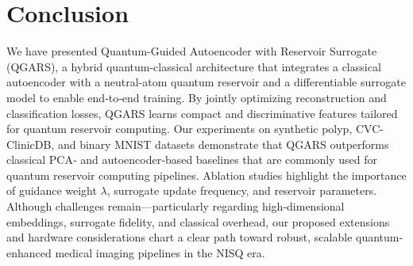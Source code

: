 \documentclass[conference]{IEEEtran}
\begin{document}
\section{Conclusion}

We have presented Quantum-Guided Autoencoder with Reservoir Surrogate (QGARS), a hybrid quantum-classical architecture that integrates a classical autoencoder with a neutral-atom quantum reservoir and a differentiable surrogate model to enable end‐to‐end training. By jointly optimizing reconstruction and classification losses, QGARS learns compact and discriminative features tailored for quantum reservoir computing. Our experiments on synthetic polyp, CVC-ClinicDB, and binary MNIST datasets demonstrate that QGARS outperforms classical PCA‐ and autoencoder‐based baselines that are commonly used for quantum reservoir computing pipelines. Ablation studies highlight the importance of guidance weight \(\lambda\), surrogate update frequency, and reservoir parameters. Although challenges remain—particularly regarding high‐dimensional embeddings, surrogate fidelity, and classical overhead, our proposed extensions and hardware considerations chart a clear path toward robust, scalable quantum‐enhanced medical imaging pipelines in the NISQ era.




\end{document}
